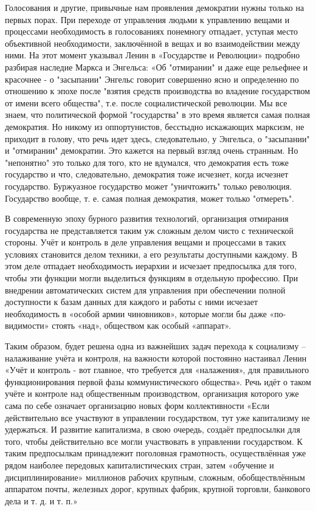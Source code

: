 \documentclass[../main]{subfiles}
\begin{document}
Голосования и другие, привычные нам проявления демократии нужны только на первых порах. При переходе от управления людьми к управлению вещами и процессами необходимость в голосованиях понемногу отпадает, уступая место объективной необходимости, заключённой в вещах и во взаимодействии между ними. На этот момент указывал Ленин в «Государстве и Революции» подробно разбирая наследие Маркса и Энгельса: «Об "отмирании" и даже еще рельефнее и красочнее - о "засыпании" Энгельс говорит совершенно ясно и определенно по отношению к эпохе после "взятия средств производства во владение государством от имени всего общества", т.е. после социалистической революции. Мы все знаем, что политической формой "государства" в это время является самая полная демократия. Но никому из оппортунистов, бесстыдно искажающих марксизм, не приходит в голову, что речь идет здесь, следовательно, у Энгельса, о "засыпании" и "отмирании" демократии. Это кажется на первый взгляд очень странным. Но "непонятно" это только для того, кто не вдумался, что демократия есть тоже государство и что, следовательно, демократия тоже исчезнет, когда исчезнет государство. Буржуазное государство может "уничтожить" только революция. Государство вообще, т. е. самая полная демократия, может только "отмереть".

В современную эпоху бурного развития технологий, организация отмирания государства не представляется таким уж сложным делом чисто с технической стороны. Учёт и контроль в деле управления вещами и процессами в таких условиях становится делом техники, а его результаты доступными каждому. В этом деле отпадает необходимость иерархии и исчезает предпосылка для того, чтобы эти функции могли выделиться функциям в отдельную профессию. При внедрении автоматических систем для управления при обеспечении полной доступности к базам данных для каждого и работы с ними исчезает необходимость в «особой армии чиновников», которые могли бы даже «по-видимости» стоять «над», обществом как особый «аппарат».

Таким образом, будет решена одна из важнейших задач перехода к социализму – налаживание учёта и контроля, на важности которой постоянно настаивал Ленин «Учёт и контроль - вот главное, что требуется для «налажения», для правильного функционирования первой фазы коммунистического общества». Речь идёт о таком учёте и контроле над общественным производством, организация которого уже сама по себе означает организацию новых форм коллективности «Если действительно все участвуют в управлении государством, тут уже капитализму не удержаться. И развитие капитализма, в свою очередь, создаёт предпосылки для того, чтобы действительно все могли участвовать в управлении государством. К таким предпосылкам принадлежит поголовная грамотность, осуществлённая уже рядом наиболее передовых капиталистических стран, затем «обучение и дисциплинирование» миллионов рабочих крупным, сложным, обобществлённым аппаратом почты, железных дорог, крупных фабрик, крупной торговли, банкового дела и т. д. и т. п.»
\end{document}
